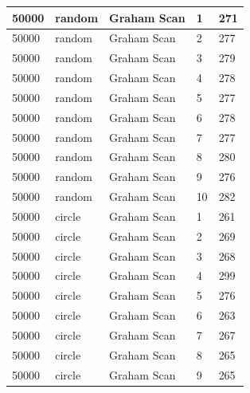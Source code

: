 \documentclass[12pt]{article}
\begin{document}
\begin{longtable}{|l|l|l|l|l|}
50000        & random            & Graham Scan & 1          & 271                           \\ \hline
50000        & random            & Graham Scan & 2          & 277                           \\ \hline
50000        & random            & Graham Scan & 3          & 279                           \\ \hline
50000        & random            & Graham Scan & 4          & 278                           \\ \hline
50000        & random            & Graham Scan & 5          & 277                           \\ \hline
50000        & random            & Graham Scan & 6          & 278                           \\ \hline
50000        & random            & Graham Scan & 7          & 277                           \\ \hline
50000        & random            & Graham Scan & 8          & 280                           \\ \hline
50000        & random            & Graham Scan & 9          & 276                           \\ \hline
50000        & random            & Graham Scan & 10         & 282                           \\ \hline
50000        & circle            & Graham Scan & 1          & 261                           \\ \hline
50000        & circle            & Graham Scan & 2          & 269                           \\ \hline
50000        & circle            & Graham Scan & 3          & 268                           \\ \hline
50000        & circle            & Graham Scan & 4          & 299                           \\ \hline
50000        & circle            & Graham Scan & 5          & 276                           \\ \hline
50000        & circle            & Graham Scan & 6          & 263                           \\ \hline
50000        & circle            & Graham Scan & 7          & 267                           \\ \hline
50000        & circle            & Graham Scan & 8          & 265                           \\ \hline
50000        & circle            & Graham Scan & 9          & 265                           \\ \hline

\end{longtable}
\end{document}
